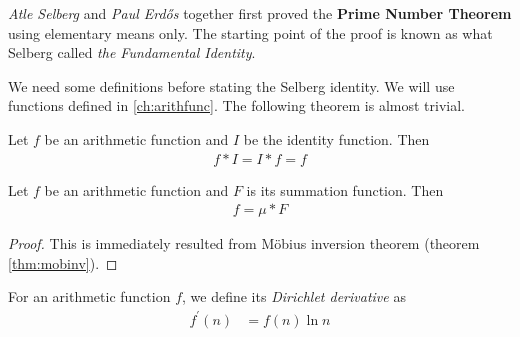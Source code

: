 \textit{Atle Selberg} and \textit{Paul Erd\H{o}s} together first proved the \textbf{Prime Number Theorem} using elementary means only. The starting point of the proof is known as what Selberg called \textit{the Fundamental Identity}.

We need some definitions before stating the Selberg identity. We will use functions defined in \autoref{ch:arithfunc}. The following theorem is almost trivial.
\begin{theorem}
	Let $f$ be an arithmetic function and $I$ be the identity function. Then
		\begin{align*}
			f\ast I=I\ast f=f
		\end{align*}
\end{theorem}

\begin{theorem}
	\label{thm:dirichmobi}
	Let $f$ be an arithmetic function and $F$ is its summation function. Then
		\begin{align*}
			f=\mu\ast F
		\end{align*}
\end{theorem}

\begin{proof}
	This is immediately resulted from M\" obius inversion theorem (theorem \eqref{thm:mobinv}).
\end{proof}

\begin{definition}
	For an arithmetic function $f$, we define its \textit{Dirichlet derivative} as
		\begin{align*}
			f^\prime(n) & =f(n)\ln n
		\end{align*}
\end{definition}


